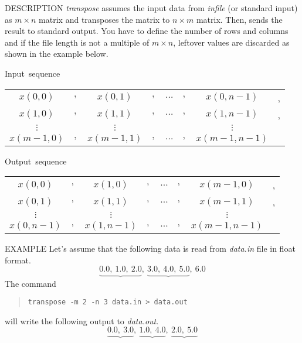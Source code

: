 \begin{synopsis}
\item[transpose] [ --m $m$ ] [ --n $n$ ] [ {\em infile} ]
\end{synopsis}

\begin{qsection}{DESCRIPTION}
{\em transpose} assumes the input data from {\em infile} (or standard
input) as $m \times n$ matrix and transposes the matrix to
$n \times m$ matrix.
Then, sends the result to standard output. 
You have to define the number of rows and columns and
if the file length is not a multiple of $m \times n$, 
leftover values are discarded as shown in the example below.

\mbox{Input sequence}
\begin{center}
\begin{tabular}{cccccccc}
$x(0,0)$&$,$&$x(0,1)$&$,$&$\ldots$&$,$&$x(0,n-1)$&,\\
$x(1,0)$&$,$&$x(1,1)$&$,$&$\ldots$&$,$&$x(1,n-1)$&,\\
$\vdots$&   &$\vdots$&   &        &   &$\vdots$& \\
$x(m-1,0)$&$,$&$x(m-1,1)$&$,$&$\ldots$&$,$&$x(m-1,n-1)$&
\end{tabular}
\end{center}

\mbox{Output sequence}
\begin{center}
\begin{tabular}{cccccccc}
$x(0,0)$&$,$&$x(1,0)$&$,$&$\ldots$&$,$&$x(m-1,0)$&,\\
$x(0,1)$&$,$&$x(1,1)$&$,$&$\ldots$&$,$&$x(m-1,1)$&,\\
$\vdots$&   &$\vdots$&   &        &   &$\vdots$& \\
$x(0,n-1)$&$,$&$x(1,n-1)$&$,$&$\ldots$&$,$&$x(m-1,n-1)$&
\end{tabular}
\end{center}

\end{qsection}

\begin{options}
\end{options}

\begin{qsection}{EXAMPLE}
Let's assume that the following data
is read from {\em data.in} file in float format.
\begin{displaymath}
 \underbrace{0.0, ~1.0, ~2.0}, ~
 \underbrace{3.0, ~4.0, ~5.0}, ~6.0
\end{displaymath}
The command
\begin{quote}
\verb!transpose -m 2 -n 3 data.in > data.out!
\end{quote}
will write the following output to {\em data.out}.
\begin{displaymath}
 \underbrace{0.0, ~3.0}, ~
 \underbrace{1.0, ~4.0}, ~
 \underbrace{2.0, ~5.0}
\end{displaymath}
\end{qsection}
